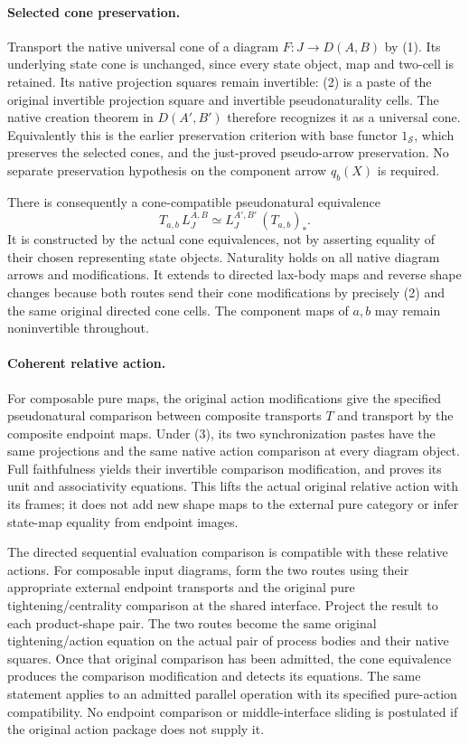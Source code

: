 \documentclass{article}
\begin{document}
\paragraph{Selected cone preservation.} Transport the native universal cone of a diagram $F:J\to D(A,B)$ by (1). Its underlying state cone is unchanged, since every state object, map and two-cell is retained. Its native projection squares remain invertible: (2) is a paste of the original invertible projection square and invertible pseudonaturality cells. The native creation theorem in $D(A',B')$ therefore recognizes it as a universal cone. Equivalently this is the earlier preservation criterion with base functor $1_{\mathcal S}$, which preserves the selected cones, and the just-proved pseudo-arrow preservation. No separate preservation hypothesis on the component arrow $q_b(X)$ is required.

There is consequently a cone-compatible pseudonatural equivalence
\[
 T_{a,b}\,L_J^{A,B}\simeq
 L_J^{A',B'}\,(T_{a,b})_*.
\tag{3}
\]
It is constructed by the actual cone equivalences, not by asserting equality of their chosen representing state objects. Naturality holds on all native diagram arrows and modifications. It extends to directed lax-body maps and reverse shape changes because both routes send their cone modifications by precisely (2) and the same original directed cone cells. The component maps of $a,b$ may remain noninvertible throughout.

\paragraph{Coherent relative action.} For composable pure maps, the original action modifications give the specified pseudonatural comparison between composite transports $T$ and transport by the composite endpoint maps. Under (3), its two synchronization pastes have the same projections and the same native action comparison at every diagram object. Full faithfulness yields their invertible comparison modification, and proves its unit and associativity equations. This lifts the actual original relative action with its frames; it does not add new shape maps to the external pure category or infer state-map equality from endpoint images.

The directed sequential evaluation comparison is compatible with these relative actions. For composable input diagrams, form the two routes using their appropriate external endpoint transports and the original pure tightening/centrality comparison at the shared interface. Project the result to each product-shape pair. The two routes become the same original tightening/action equation on the actual pair of process bodies and their native squares. Once that original comparison has been admitted, the cone equivalence produces the comparison modification and detects its equations. The same statement applies to an admitted parallel operation with its specified pure-action compatibility. No endpoint comparison or middle-interface sliding is postulated if the original action package does not supply it.
\end{document}
